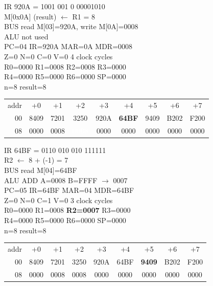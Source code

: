 \noindent\begin{tcolorbox}[stepbox, title={Step 4 \hfill PC 03 \quad ST R1, result}]
\textcolor{dim}{IR} 920A = 1001 001 0 00001010\\
M[0x0A] (result) $\leftarrow$ R1 = 8\\
\textcolor{dim}{BUS} read M[03]=920A, \textcolor{wrt}{write M[0A]=0008}\\
\textcolor{dim}{ALU} \textcolor{dim}{not used}\\
PC=04 IR=920A MAR=0A MDR=0008\\
Z=0 N=0 C=0 V=0 \hfill \textcolor{dim}{4 clock cycles}\\
R0=0000 R1=0008 R2=0008 R3=0000\\
R4=0000 R5=0000 R6=0000 SP=0000\\
\textcolor{dim}{n=8  result=8}\\[1pt]
{\setlength{\tabcolsep}{1.6pt}\begin{tabular}{@{}r*{8}{c}@{}}
\textcolor{dim}{addr} & \textcolor{dim}{+0} & \textcolor{dim}{+1} & \textcolor{dim}{+2} & \textcolor{dim}{+3} & \textcolor{dim}{+4} & \textcolor{dim}{+5} & \textcolor{dim}{+6} & \textcolor{dim}{+7}\\
\textcolor{dim}{00} & 8409 & 7201 & 3250 & 920A & \cellcolor{pcc}\textbf{64BF} & 9409 & B202 & F200\\
\textcolor{dim}{08} & 0000 & \cellcolor{datac}0008 & \cellcolor{wrt}\textcolor{white}{\textbf{0008}} & 0000 & 0000 & 0000 & 0000 & 0000\\
\end{tabular}}
\end{tcolorbox}\hfill\begin{tcolorbox}[stepbox, title={Step 5 \hfill PC 04 \quad ADDI R2, R2, -1}]
\textcolor{dim}{IR} 64BF = 0110 010 010 111111\\
R2 $\leftarrow$ 8 + (-1) = 7\\
\textcolor{dim}{BUS} read M[04]=64BF\\
\textcolor{dim}{ALU} ADD A=0008 B=FFFF $\rightarrow$ 0007\\
PC=05 IR=64BF MAR=04 MDR=64BF\\
Z=0 N=0 C=1 V=0 \hfill \textcolor{dim}{3 clock cycles}\\
R0=0000 R1=0008 \textcolor{wrt}{\textbf{R2=0007}} R3=0000\\
R4=0000 R5=0000 R6=0000 SP=0000\\
\textcolor{dim}{n=8  result=8}\\[1pt]
{\setlength{\tabcolsep}{1.6pt}\begin{tabular}{@{}r*{8}{c}@{}}
\textcolor{dim}{addr} & \textcolor{dim}{+0} & \textcolor{dim}{+1} & \textcolor{dim}{+2} & \textcolor{dim}{+3} & \textcolor{dim}{+4} & \textcolor{dim}{+5} & \textcolor{dim}{+6} & \textcolor{dim}{+7}\\
\textcolor{dim}{00} & 8409 & 7201 & 3250 & 920A & 64BF & \cellcolor{pcc}\textbf{9409} & B202 & F200\\
\textcolor{dim}{08} & 0000 & \cellcolor{datac}0008 & \cellcolor{datac}0008 & 0000 & 0000 & 0000 & 0000 & 0000\\
\end{tabular}}
\end{tcolorbox}\par\vspace{3pt}
